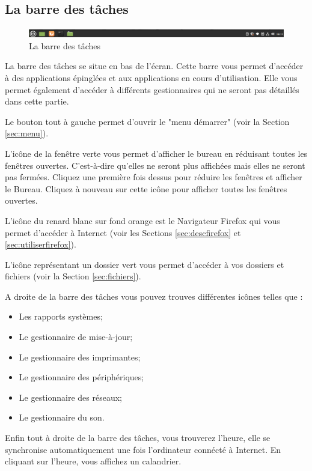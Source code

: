 \documentclass[12pt]{book}
\begin{document}
	\subsection{La barre des tâches}\label{sec:barretaches}
		\begin{figure}[h]
			\centering
			\includegraphics[width=\textwidth]{include/barretaches.png}
			\caption{La barre des tâches}
			\label{fig:barretaches}
		\end{figure}
		La barre des tâches se situe en bas de l'écran.
		Cette barre vous permet d'accéder à des applications épinglées et aux applications en cours d'utilisation.
		Elle vous permet également d'accéder à différents gestionnaires qui ne seront pas détaillés dans cette partie.\par
		Le bouton tout à gauche permet d'ouvrir le "menu démarrer" (voir la Section \ref{sec:menu}).\par
		L'icône de la fenêtre verte vous permet d'afficher le bureau en réduisant toutes les fenêtres ouvertes.
		C'est-à-dire qu'elles ne seront plus affichées mais elles ne seront pas fermées.
		Cliquez une première fois dessus pour réduire les fenêtres et afficher le Bureau. 
		Cliquez à nouveau sur cette icône pour afficher toutes les fenêtres ouvertes.\par
		L'icône du renard blanc sur fond orange est le Navigateur Firefox qui vous permet d'accéder à Internet (voir les Sections \ref{sec:descfirefox} et \ref{sec:utiliserfirefox}).\par
		L'icône représentant un dossier vert vous permet d'accéder à vos dossiers et fichiers (voir la Section \ref{sec:fichiers}).\par
		A droite de la barre des tâches vous pouvez trouves différentes icônes telles que :
		\begin{itemize}
			\item Les rapports systèmes;
			\item Le gestionnaire de mise-à-jour;
			\item Le gestionnaire des imprimantes;
			\item Le gestionnaire des périphériques;
			\item Le gestionnaire des réseaux;
			\item Le gestionnaire du son.
		\end{itemize}\par
		Enfin tout à droite de la barre des tâches, vous trouverez l'heure, elle se synchronise automatiquement une fois l'ordinateur connécté à Internet.
		En cliquant sur l'heure, vous affichez un calandrier.
\end{document}
